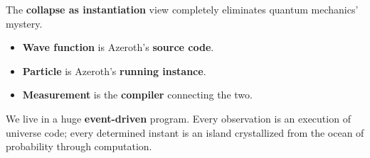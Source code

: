 The \textbf{collapse as instantiation} view completely eliminates quantum mechanics' mystery.

\begin{itemize}
\item \textbf{Wave function} is Azeroth's \textbf{source code}.
\item \textbf{Particle} is Azeroth's \textbf{running instance}.
\item \textbf{Measurement} is the \textbf{compiler} connecting the two.
\end{itemize}

We live in a huge \textbf{event-driven} program. Every observation is an execution of universe code; every determined instant is an island crystallized from the ocean of probability through computation.
